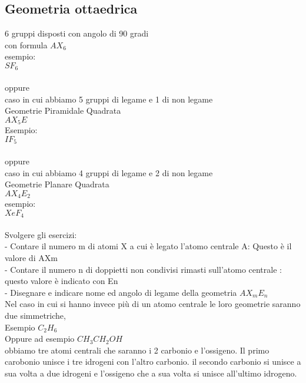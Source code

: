 \subsection{Geometria ottaedrica}
6 gruppi disposti con angolo di 90 gradi \\
con formula $AX_6$\\
esempio:\\
$SF_6$\\\\
oppure\\
caso in cui abbiamo 5 gruppi di legame e 1 di non legame\\
Geometrie Piramidale Quadrata\\
$AX_5E$\\
Esempio:\\
$IF_5$\\\\
oppure\\
caso in cui abbiamo 4 gruppi di legame e 2 di non legame\\
Geometrie Planare Quadrata\\
$AX_4E_2$\\
esempio:\\
$XeF_4$\\\\
Svolgere gli esercizi:\\
\tab- Contare il numero m di atomi X a cui è legato l’atomo centrale A: Questo è il valore di AXm\\
\tab- Contare il numero n di doppietti non condivisi rimasti sull’atomo centrale : questo valore è indicato con En\\
\tab- Disegnare e indicare nome ed angolo di legame della geometria $AX_mE_n$\\
Nel caso in cui si hanno invece più di un atomo centrale le loro geometrie saranno due simmetriche,\\
Esempio $C_2H_6$\\
Oppure ad esempio $CH_3CH_2OH$\\
obbiamo tre atomi centrali che saranno i 2 carbonio e l’ossigeno. Il primo carobonio unisce i tre idrogeni con l’altro carbonio. il secondo carbonio si unisce a sua volta a due idrogeni e l’ossigeno che a sua volta si unisce all’ultimo idrogeno.
